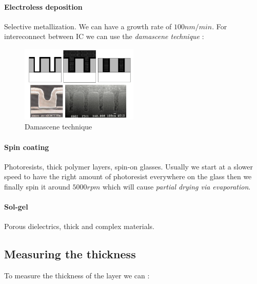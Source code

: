 \documentclass[
]{article}
\begin{document}
\hypertarget{electroless-deposition}{%
\paragraph{Electroless deposition}\label{electroless-deposition}}

Selective metallization. We can have a growth rate of \(100nm/min\). For
intereconnect between IC we can use the \emph{damascene technique} :

\begin{figure}
\hypertarget{fig:enter-label}{%
\centering
\includegraphics[width=0.5\textwidth,height=\textheight]{damascene_technique.png}
\caption{Damascene technique}\label{fig:enter-label}
}
\end{figure}

\hypertarget{spin-coating}{%
\paragraph{Spin coating}\label{spin-coating}}

Photoresists, thick polymer layers, spin-on glasses. Usually we start at
a slower speed to have the right amount of photoresist everywhere on the
glass then we finally spin it around \(5000 rpm\) which will cause
\emph{partial drying via evaporation}.

\hypertarget{sol-gel}{%
\paragraph{Sol-gel}\label{sol-gel}}

Porous dielectrics, thick and complex materials.

\hypertarget{measuring-the-thickness}{%
\subsection{Measuring the thickness}\label{measuring-the-thickness}}

To measure the thickness of the layer we can :
\end{document}
